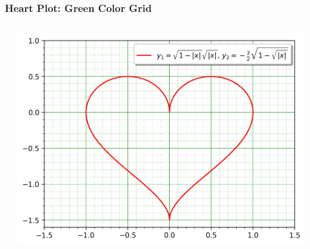 \documentclass[xcolor={svgnames}]{beamer}
\newcommand{\pyfile}[2][]{}
\begin{document}
\begin{frame}[t,fragile]
    \frametitle{Heart Plot: Green Color Grid}
    \vspace{-2mm}
    \begin{columns}[T]
        \begin{column}{0.47\textwidth}
            \pyfile[style=tiny,linerange=30]{examples/heart-3.py}
        \end{column}
        \begin{column}{0.53\textwidth}
            \includegraphics[width=\textwidth]{img/heart-3.png}
        \end{column}
    \end{columns}
\end{frame}
\end{document}
